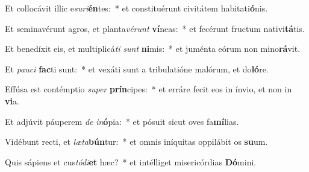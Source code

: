 \item Et collocávit illic e\textit{su}\textit{ri}\textbf{én}tes:~* et constituérunt civitátem habitati\textbf{ó}nis.
\item Et seminavérunt agros, et planta\textit{vé}\textit{runt} \textbf{ví}neas:~* et fecérunt fructum nativi\textbf{tá}tis.
\item Et benedíxit eis, et multiplicá\textit{ti} \textit{sunt} \textbf{ni}mis:~* et juménta eórum non mino\textbf{rá}vit.
\item Et \textit{pau}\textit{ci} \textbf{fac}ti sunt:~* et vexáti sunt a tribulatióne malórum, et do\textbf{ló}re.
\item Effúsa est contémptio \textit{su}\textit{per} \textbf{prín}cipes:~* et erráre fecit eos in ínvio, et non in \textbf{vi}a.
\item Et adjúvit páuperem \textit{de} \textit{in}\textbf{ó}pia:~* et pósuit sicut oves fa\textbf{mí}lias.
\item Vidébunt recti, et \textit{læ}\textit{ta}\textbf{bún}tur:~* et omnis iníquitas oppilábit os \textbf{su}um.
\item Quis sápiens et cus\textit{tó}\textit{di}\textbf{et} hæc?~* et intélliget misericórdias \textbf{Dó}mini.
